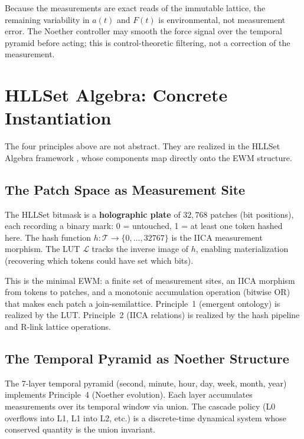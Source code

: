 \documentclass[11pt,a4paper]{article}
\theoremstyle{remark}
\begin{document}
Because the measurements are exact reads of the immutable lattice, the
remaining variability in $a(t)$ and $F(t)$ is environmental, not measurement
error. The Noether controller may smooth the force signal over the temporal
pyramid before acting; this is control-theoretic filtering, not a correction
of the measurement.

\section{HLLSet Algebra: Concrete Instantiation}
\label{sec:hllset}

The four principles above are not abstract. They are realized in the HLLSet Algebra
framework \cite{astesj2026}, whose components map directly onto the EWM structure.

\subsection{The Patch Space as Measurement Site}

The HLLSet bitmask is a \textbf{holographic plate} of $32{,}768$ patches (bit
positions), each recording a binary mark: 0 = untouched, 1 = at least one token hashed
here. The hash function $h: \mathcal{T} \to \{0,\ldots,32767\}$ is the IICA measurement
morphism. The LUT $\mathcal{L}$ tracks the inverse image of $h$, enabling materialization
(recovering which tokens could have set which bits).

This is the minimal EWM: a finite set of measurement sites, an IICA morphism from tokens
to patches, and a monotonic accumulation operation (bitwise OR) that makes each patch a
join-semilattice. Principle~1 (emergent ontology) is realized by the LUT. Principle~2
(IICA relations) is realized by the hash pipeline and R-link lattice operations.

\subsection{The Temporal Pyramid as Noether Structure}

The 7-layer temporal pyramid (second, minute, hour, day, week, month, year) implements
Principle~4 (Noether evolution). Each layer accumulates measurements over its temporal
window via union. The cascade policy (L0 overflows into L1, L1 into L2, etc.) is a
discrete-time dynamical system whose conserved quantity is the union invariant.
\end{document}
